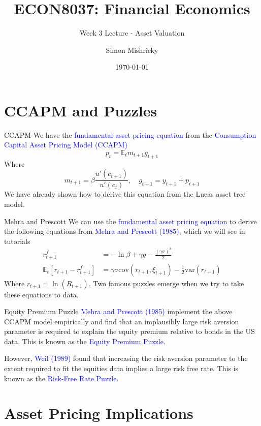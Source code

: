 \documentclass[aspectratio=169,xcolor=dvipsnames]{beamer}
\title{ECON8037: Financial Economics}
\subtitle{\normalsize Week 3 Lecture - Asset Valuation}
\author{Simon Mishricky}
\institute{Research School of Economics, Australian National University}
\date{\today}
\begin{document}
\section{CCAPM and Puzzles}
\frame{\titlepage}

\begin{frame}{CCAPM}
    We have the \textcolor{blue}{fundamental asset pricing equation} from the \textcolor{blue}{Consumption Capital Asset Pricing Model (CCAPM)}
    \[
        p_t = \mathbb{E}_t m_{t+1} g_{t+1}
    \]
    Where
    \[
        m_{t+1} = \beta \frac{u'(c_{t+1})}{u'(c_t)}, \quad g_{t+1} = y_{t+1} + p_{t+1}
    \]
    We have already shown how to derive this equation from the Lucas asset tree model.
\end{frame}

\begin{frame}{Mehra and Prescott}
    We can use the \textcolor{blue}{fundamental asset pricing equation} to derive the following equations from \textcolor{blue}{Mehra and Prescott (1985)}, which we will see in tutorials
    \begin{align*}
        r^f_{t+1} &= -\ln \beta + \gamma g - \frac{(\gamma \sigma)^2}{2} \\
        \mathbb{E}_t\left[r_{t+1} - r^f_{t+1}\right] &= \gamma \sigma \mathrm{cov}(r_{t+1}, \xi_{t+1}) - \frac{1}{2}\mathrm{var}(r_{t+1})
    \end{align*}
    Where $r_{t+1} = \ln(R_{t+1})$. Two famous puzzles emerge when we try to take these equations to data.
\end{frame}

\begin{frame}{Equity Premium Puzzle}
    \textcolor{blue}{Mehra and Prescott (1985)} implement the above CCAPM model empirically and find that an implausibly large risk aversion parameter is required to explain the equity premium relative to bonds in the US data. This is known as the \textcolor{blue}{Equity Premium Puzzle}.

    However, \textcolor{blue}{Weil (1989)} found that increasing the risk aversion parameter to the extent required to fit the equities data implies a large risk free rate. This is known as the \textcolor{blue}{Risk-Free Rate Puzzle}.
\end{frame}

\section{Asset Pricing Implications}
\end{document}
